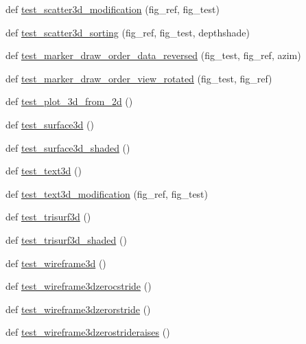 \begin{DoxyCompactItemize}
\item 
def \hyperlink{namespacetests_1_1test__mplot3d_ad1555f084c261353e569caaae5b980b9}{test\+\_\+scatter3d\+\_\+modification} (fig\+\_\+ref, fig\+\_\+test)
\item 
def \hyperlink{namespacetests_1_1test__mplot3d_a2379f23631ae6a1cf45c43b339c6bd83}{test\+\_\+scatter3d\+\_\+sorting} (fig\+\_\+ref, fig\+\_\+test, depthshade)
\item 
def \hyperlink{namespacetests_1_1test__mplot3d_ac2aa96ade4eb23ca2ecab24b84325c01}{test\+\_\+marker\+\_\+draw\+\_\+order\+\_\+data\+\_\+reversed} (fig\+\_\+test, fig\+\_\+ref, azim)
\item 
def \hyperlink{namespacetests_1_1test__mplot3d_a949c38e32b568257a430ce97d68f5ff8}{test\+\_\+marker\+\_\+draw\+\_\+order\+\_\+view\+\_\+rotated} (fig\+\_\+test, fig\+\_\+ref)
\item 
def \hyperlink{namespacetests_1_1test__mplot3d_a0016c87ba6c29376e7493500e155145a}{test\+\_\+plot\+\_\+3d\+\_\+from\+\_\+2d} ()
\item 
def \hyperlink{namespacetests_1_1test__mplot3d_a46bd7402fc21492ad4dc312255386095}{test\+\_\+surface3d} ()
\item 
def \hyperlink{namespacetests_1_1test__mplot3d_a2443f470123115d756fd2da1b9cbcb1a}{test\+\_\+surface3d\+\_\+shaded} ()
\item 
def \hyperlink{namespacetests_1_1test__mplot3d_a76a8b0e5e1a30de1cb5b697d5052d8cd}{test\+\_\+text3d} ()
\item 
def \hyperlink{namespacetests_1_1test__mplot3d_a39303500273d2de9bf56256d744f900b}{test\+\_\+text3d\+\_\+modification} (fig\+\_\+ref, fig\+\_\+test)
\item 
def \hyperlink{namespacetests_1_1test__mplot3d_a8fd689a86ad9b9ec7078fea430217c0e}{test\+\_\+trisurf3d} ()
\item 
def \hyperlink{namespacetests_1_1test__mplot3d_a306eff8c1cf501f52c2fc954965715bd}{test\+\_\+trisurf3d\+\_\+shaded} ()
\item 
def \hyperlink{namespacetests_1_1test__mplot3d_a1fdf73d0d696a8b10ebac1051fd5f036}{test\+\_\+wireframe3d} ()
\item 
def \hyperlink{namespacetests_1_1test__mplot3d_a139c94da37e51a8983b0cdb5aa4f8f08}{test\+\_\+wireframe3dzerocstride} ()
\item 
def \hyperlink{namespacetests_1_1test__mplot3d_a1b904e6cca7870cdd4b579188dfffbb9}{test\+\_\+wireframe3dzerorstride} ()
\item 
def \hyperlink{namespacetests_1_1test__mplot3d_a98fe49e60a68c975a1740a6c4a4df927}{test\+\_\+wireframe3dzerostrideraises} ()

\end{DoxyCompactItemize}
